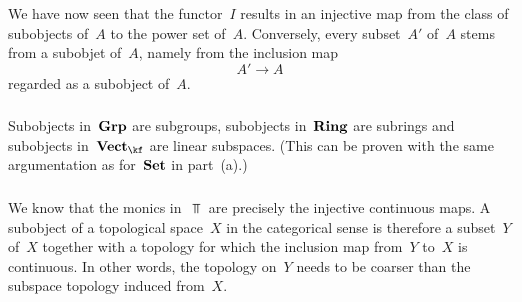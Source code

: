 We have now seen that the functor~$I$ results in an injective map from the class of subobjects of~$A$ to the power set of~$A$.
Conversely, every subset~$A'$ of~$A$ stems from a subobjet of~$A$, namely from the inclusion map
\[
	A' \to A
\]
regarded as a subobject of~$A$.



\subsubsection{}

Subobjects in~$\mathbf{Grp}$ are subgroups, subobjects in~$\mathbf{Ring}$ are subrings and subobjects in~$\Vect{\kf}$ are linear subspaces.
(This can be proven with the same argumentation as for~$\mathbf{Set}$ in part~(a).)



\subsubsection{}

We know that the monics in~$\Top$ are precisely the injective continuous maps.
A subobject of a topological space~$X$ in the categorical sense is therefore a subset~$Y$ of~$X$ together with a topology for which the inclusion map from~$Y$ to~$X$ is continuous.
In other words, the topology on~$Y$ needs to be coarser than the subspace topology induced from~$X$.
